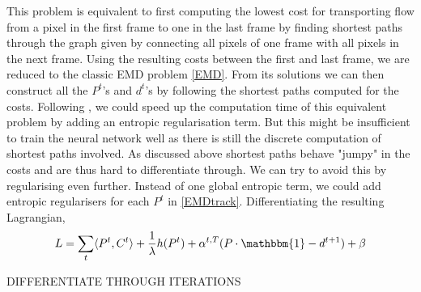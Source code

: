\documentclass{article}
\begin{document}
This problem is equivalent to first computing the lowest cost for transporting flow from a pixel in the first frame to one in the last frame by finding shortest paths through the graph given by connecting all pixels of one frame with all pixels in the next frame. Using the resulting costs between the first and last frame, we are reduced to the classic EMD problem \ref{EMD}. From its solutions we can then construct all the $P^t$'s and $d^t$'s by following the shortest paths computed for the costs. Following \cite{Cut13}, we could speed up the computation time of this equivalent problem by adding an entropic regularisation term. But this might be insufficient to train the neural network well as there is still the discrete computation of shortest paths involved. As discussed above shortest paths behave "jumpy" in the costs and are thus hard to differentiate through. We can try to avoid this by regularising even further. Instead of one global entropic term, we could add entropic regularisers for each $P^t$ in \ref{EMDtrack}. Differentiating the resulting Lagrangian,
\begin{align}
L = \sum_{t} \langle P^t, C^t \rangle + \frac{1}{\lambda} h(P^t) + \alpha^{t,T} (P\cdot \mathbbm{1}- d^{t+1}) + \beta



\end{align}

DIFFERENTIATE THROUGH ITERATIONS



\end{document}
